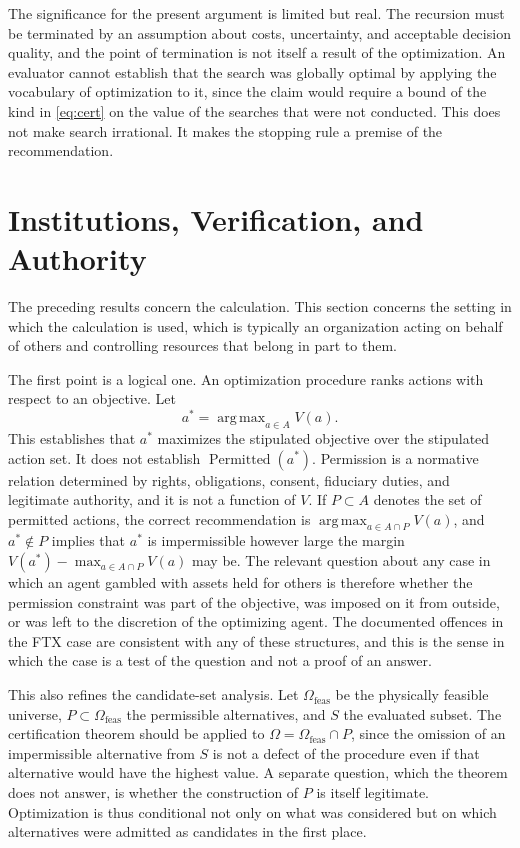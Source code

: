 \documentclass[11pt]{article}
\theoremstyle{definition}
\theoremstyle{remark}
\DeclareMathOperator*{\argmax}{arg\,max}
\DeclareMathOperator{\Perm}{Permitted}
\begin{document}
The significance for the present argument is limited but real. The recursion must be terminated by an assumption about costs, uncertainty, and acceptable decision quality, and the point of termination is not itself a result of the optimization. An evaluator cannot establish that the search was globally optimal by applying the vocabulary of optimization to it, since the claim would require a bound of the kind in \eqref{eq:cert} on the value of the searches that were not conducted. This does not make search irrational. It makes the stopping rule a premise of the recommendation.

\section{Institutions, Verification, and Authority}
\label{sec:authority}

The preceding results concern the calculation. This section concerns the setting in which the calculation is used, which is typically an organization acting on behalf of others and controlling resources that belong in part to them.

The first point is a logical one. An optimization procedure ranks actions with respect to an objective. Let
\begin{equation}
a^{*}=\argmax_{a\in A}V(a).
\end{equation}
This establishes that $a^{*}$ maximizes the stipulated objective over the stipulated action set. It does not establish $\Perm(a^{*})$. Permission is a normative relation determined by rights, obligations, consent, fiduciary duties, and legitimate authority, and it is not a function of $V$. If $P\subset A$ denotes the set of permitted actions, the correct recommendation is $\argmax_{a\in A\cap P}V(a)$, and $a^{*}\notin P$ implies that $a^{*}$ is impermissible however large the margin $V(a^{*})-\max_{a\in A\cap P}V(a)$ may be. The relevant question about any case in which an agent gambled with assets held for others is therefore whether the permission constraint was part of the objective, was imposed on it from outside, or was left to the discretion of the optimizing agent. The documented offences in the FTX case \citep{doj2024} are consistent with any of these structures, and this is the sense in which the case is a test of the question and not a proof of an answer.

This also refines the candidate-set analysis. Let $\Omega_{\mathrm{feas}}$ be the physically feasible universe, $P\subset\Omega_{\mathrm{feas}}$ the permissible alternatives, and $S$ the evaluated subset. The certification theorem should be applied to $\Omega=\Omega_{\mathrm{feas}}\cap P$, since the omission of an impermissible alternative from $S$ is not a defect of the procedure even if that alternative would have the highest value. A separate question, which the theorem does not answer, is whether the construction of $P$ is itself legitimate. Optimization is thus conditional not only on what was considered but on which alternatives were admitted as candidates in the first place.
\end{document}
